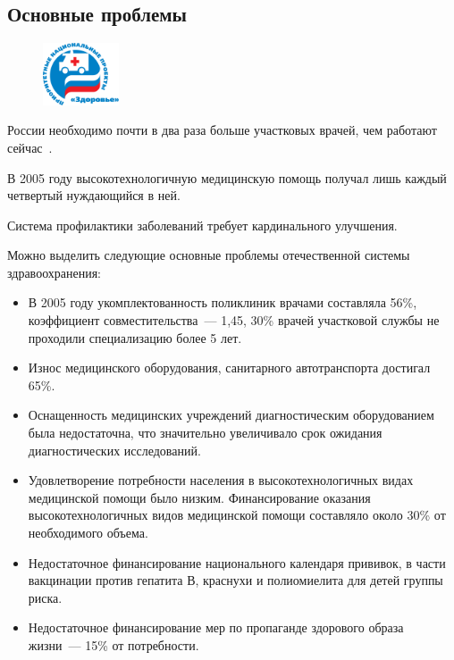\documentclass[article, 12pt, russian, oneside]{ncc}
\begin{document}
\subsection{Основные проблемы}

\begin{figure}
  \begin{center}
    \includegraphics[width=0.2\textwidth]{NPR_Health}
  \end{center}
\end{figure}

России необходимо почти в два раза больше участковых врачей, чем
работают сейчас~\cite{Health_Problems}.


В 2005 году высокотехнологичную медицинскую помощь получал лишь каждый
четвертый нуждающийся в ней.

Система профилактики заболеваний требует кардинального улучшения.


Можно выделить следующие основные проблемы отечественной системы
здравоохранения:

\begin{itemize}
\item В 2005 году укомплектованность поликлиник врачами составляла
  56\%, коэффициент совместительства~--- 1,45, 30\% врачей участковой
  службы не проходили специализацию более 5 лет.
\item Износ медицинского оборудования, санитарного автотранспорта
  достигал 65\%.
\item Оснащенность медицинских учреждений диагностическим
  оборудованием была недостаточна, что значительно увеличивало срок
  ожидания диагностических исследований.
\item Удовлетворение потребности населения в высокотехнологичных видах
  медицинской помощи было низким. Финансирование оказания
  высокотехнологичных видов медицинской помощи составляло около 30\%
  от необходимого объема.
\item Недостаточное финансирование национального календаря прививок, в
  части вакцинации против гепатита В, краснухи и полиомиелита для
  детей группы риска.
\item Недостаточное финансирование мер по пропаганде здорового образа
  жизни~--- 15\% от потребности.
\end{itemize}
\end{document}
